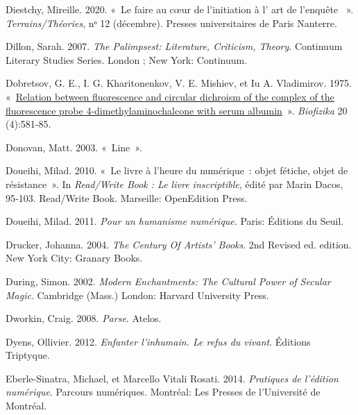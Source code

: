 \begin{CSLReferences}{1}{0}
\leavevmode{}%
Diestchy, Mireille. 2020. {«~{Le {\guillemotleft} faire
{\guillemotright} au c{œ}ur de l'initiation {à} l'{\guillemotleft} art
de l'enqu{ê}te {\guillemotright}}~»}. \emph{Terrains/Th{é}ories}, nᵒ 12
(décembre). {Presses universitaires de Paris Nanterre}.

\leavevmode{}%
Dillon, Sarah. 2007. \emph{The {Palimpsest}: {Literature}, {Criticism},
{Theory}}. Continuum Literary Studies Series. {London ; New York}:
{Continuum}.

\leavevmode{}%
Dobretsov, G. E., I. G. Kharitonenkov, V. E. Mishiev, et Iu A.
Vladimirov. 1975.
{«~\href{https://www.ncbi.nlm.nih.gov/pubmed/94}{{Relation between
fluorescence and circular dichroism of the complex of the fluorescence
probe 4-dimethylaminochalcone with serum albumin}}~»}. \emph{Biofizika}
20 (4):581‑85.

\leavevmode{}%
Donovan, Matt. 2003. {«~Line~»}.

\leavevmode{}%
Doueihi, Milad. 2010. {«~{Le livre {à} l'heure du num{é}rique~: objet
f{é}tiche, objet de r{é}sistance}~»}. In \emph{{Read/Write Book : Le
livre inscriptible}}, édité par Marin Dacos, 95‑103. {Read/Write Book}.
{Marseille}: {OpenEdition Press}.

\leavevmode{}%
Doueihi, Milad. 2011. \emph{{Pour un humanisme num{é}rique}}. {Paris}:
{{É}ditions du Seuil}.

\leavevmode{}%
Drucker, Johanna. 2004. \emph{The {Century Of Artists}' {Books}}. 2nd
Revised ed. edition. {New York City}: {Granary Books}.

\leavevmode{}%
During, Simon. 2002. \emph{Modern {Enchantments}: The {Cultural Power}
of {Secular Magic}}. {Cambridge (Mass.) London}: {Harvard University
Press}.

\leavevmode{}%
Dworkin, Craig. 2008. \emph{{Parse}}. {Atelos}.

\leavevmode{}%
Dyens, Ollivier. 2012. \emph{{Enfanter l'inhumain. Le refus du vivant}}.
{{É}ditions Triptyque}.

\leavevmode{}%
Eberle-Sinatra, Michael, et Marcello Vitali Rosati. 2014.
\emph{{Pratiques de l'{é}dition num{é}rique}}. {Parcours num{é}riques}.
{Montr{é}al}: {Les Presses de l'Universit{é} de Montr{é}al}.


\end{CSLReferences}

